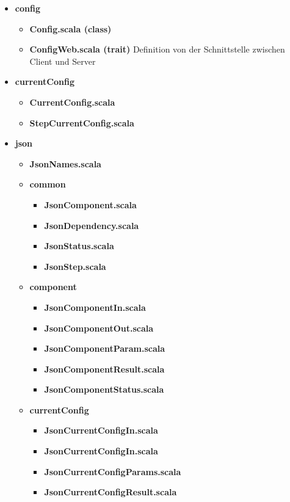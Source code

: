 \documentclass{article}
\begin{document}
\begin{itemize}
  \item \textbf{config}
  \begin{itemize}
    \item \textbf{Config.scala (class)}
    \item \textbf{ConfigWeb.scala (trait)} Definition von der Schnittstelle
    zwischen Client und Server
  \end{itemize}
  \item \textbf{currentConfig}
  \begin{itemize}
    \item \textbf{CurrentConfig.scala}
    \item \textbf{StepCurrentConfig.scala}
  \end{itemize}
  \item \textbf{json}
  \begin{itemize}
    \item \textbf{JsonNames.scala}
    \item \textbf{common}
    \begin{itemize}
      \item \textbf{JsonComponent.scala}
      \item \textbf{JsonDependency.scala}
      \item \textbf{JsonStatus.scala}
      \item \textbf{JsonStep.scala}
    \end{itemize}
    \item \textbf{component}
    \begin{itemize}
      \item \textbf{JsonComponentIn.scala}
      \item \textbf{JsonComponentOut.scala}
      \item \textbf{JsonComponentParam.scala}
      \item \textbf{JsonComponentResult.scala}
      \item \textbf{JsonComponentStatus.scala}
    \end{itemize}
    \item \textbf{currentConfig}
    \begin{itemize}
      \item \textbf{JsonCurrentConfigIn.scala}
      \item \textbf{JsonCurrentConfigIn.scala}
      \item \textbf{JsonCurrentConfigParams.scala}
      \item \textbf{JsonCurrentConfigResult.scala}

\end{itemize}
\end{itemize}
\end{itemize}
\end{document}
